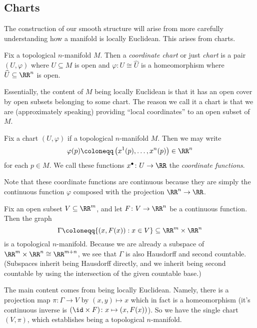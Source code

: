 \documentclass[../notes.tex]{subfiles}
\begin{document}
\subsection{Charts}
The construction of our smooth structure will arise from more carefully understanding how a manifold is locally Euclidean. This arises from charts.
\begin{definition}[chart]
	Fix a topological $n$-manifold $M$. Then a \textit{coordinate chart} or just \textit{chart} is a pair $(U,\varphi)$ where $U\subseteq M$ is open and $\varphi\colon U\cong\widehat U$ is a homeomorphism where $\widehat U\subseteq\RR^n$ is open.
\end{definition}
Essentially, the content of $M$ being locally Euclidean is that it has an open cover by open subsets belonging to some chart. The reason we call it a chart is that we are (approximately speaking) providing ``local coordinates'' to an open subset of $M$.
\begin{definition}
	Fix a chart $(U,\varphi)$ if a topological $n$-manifold $M$. Then we may write
	\[\varphi(p)\coloneqq\left(x^1(p),\ldots,x^n(p)\right)\in\RR^n\]
	for each $p\in M$. We call these functions $x^\bullet\colon U\to\RR$ the \textit{coordinate functions}.
\end{definition}
Note that these coordinate functions are continuous because they are simply the continuous function $\varphi$ composed with the projection $\RR^n\to\RR$.
\begin{example}
	Fix an open subset $V\subseteq\RR^m$, and let $F\colon V\to\RR^n$ be a continuous function. Then the graph
	\[\Gamma\coloneqq\{(x,F(x)):x\in V\}\subseteq\RR^m\times\RR^n\]
	is a topological $n$-manifold. Because we are already a subspace of $\RR^m\times\RR^n\cong\RR^{m+n}$, we see that $\Gamma$ is also Hausdorff and second countable. (Subspaces inherit being Hausdorff directly, and we inherit being second countable by using the intersection of the given countable base.)
	
	The main content comes from being locally Euclidean. Namely, there is a projection map $\pi\colon\Gamma\to V$ by $(x,y)\mapsto x$ which in fact is a homeomorphism (it's continuous inverse is $({\id}\times F)\colon x\mapsto(x,F(x))$). So we have the single chart $(V,\pi)$, which establishes being a topological $n$-manifold.
\end{example}
\end{document}
